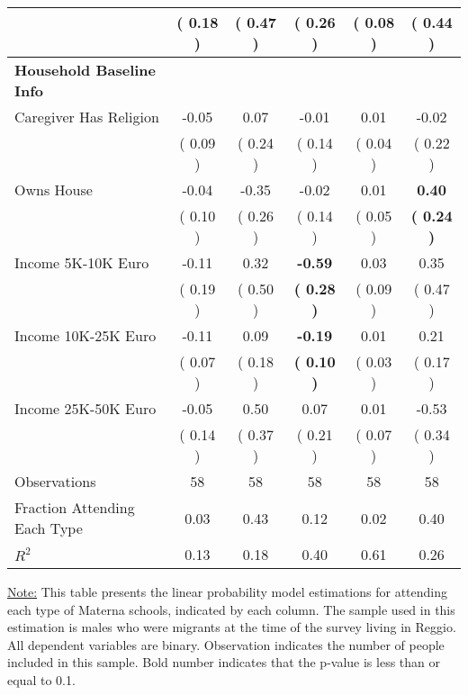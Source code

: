 \begin{table}[H]
{\begin{tabular}{lccccc}
\quad  & (     0.18 ) & (     0.47 )  & (     0.26 )  & (     0.08 ) & (     0.44 ) \\
\midrule
\textbf{Household Baseline Info} \\
\quad Caregiver Has Religion &     -0.05 &      0.07 &     -0.01 &      0.01 &     -0.02 \\
\quad  & (     0.09 ) & (     0.24 )  & (     0.14 )  & (     0.04 ) & (     0.22 ) \\
\quad Owns House &     -0.04 &     -0.35 &     -0.02 &      0.01 & \textbf{     0.40} \\
\quad  & (     0.10 ) & (     0.26 )  & (     0.14 )  & (     0.05 ) & \textbf{(     0.24 )} \\
\quad Income 5K-10K Euro &     -0.11 &      0.32 & \textbf{    -0.59} &      0.03 &      0.35 \\
\quad  & (     0.19 ) & (     0.50 )  & \textbf{(     0.28 )}  & (     0.09 ) & (     0.47 ) \\
\quad Income 10K-25K Euro &     -0.11 &      0.09 & \textbf{    -0.19} &      0.01 &      0.21 \\
\quad  & (     0.07 ) & (     0.18 )  & \textbf{(     0.10 )}  & (     0.03 ) & (     0.17 ) \\
\quad Income 25K-50K Euro &     -0.05 &      0.50 &      0.07 &      0.01 &     -0.53 \\
\quad  & (     0.14 ) & (     0.37 )  & (     0.21 )  & (     0.07 ) & (     0.34 ) \\
\midrule
Observations & 58 & 58 & 58 & 58 & 58 \\
Fraction Attending Each Type &      0.03 &      0.43 &      0.12 &      0.02 &      0.40 \\
\midrule
$ R^2$ &      0.13 &      0.18 &      0.40 &      0.61 &      0.26 \\
\bottomrule
\end{tabular}}
\end{table}
\begin{footnotesize}
\noindent\underline{Note:} This table presents the linear probability model estimations for attending each type of Materna schools, indicated by each column. The sample used in this estimation is males who were migrants at the time of the survey living in Reggio. All dependent variables are binary. Observation indicates the number of people included in this sample. Bold number indicates that the p-value is less than or equal to 0.1.
\end{footnotesize}
